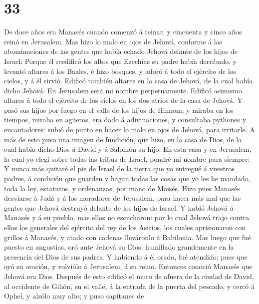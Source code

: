 \hypertarget{section-32}{%
\section{33}\label{section-32}}

 De doce años era Manasés cuando comenzó á reinar, y
cincuenta y cinco años reinó en Jerusalem.  Mas hizo lo
malo en ojos de Jehová, conforme á las abominaciones de las gentes que
había echado Jehová delante de los hijos de Israel: 
Porque él reedificó los altos que Ezechîas su padre había derribado, y
levantó altares á los Baales, é hizo bosques, y adoró á todo el ejército
de los cielos, y á él sirvió.  Edificó también altares en
la casa de Jehová, de la cual había dicho Jehová: En Jerusalem será mi
nombre perpetuamente.  Edificó asimismo altares á todo el
ejército de los cielos en los dos atrios de la casa de Jehová.
 Y pasó sus hijos por fuego en el valle de los hijos de
Hinnom; y miraba en los tiempos, miraba en agüeros, era dado á
adivinaciones, y consultaba pythones y encantadores: subió de punto en
hacer lo malo en ojos de Jehová, para irritarle.  A más de
esto puso una imagen de fundición, que hizo, en la casa de Dios, de la
cual había dicho Dios á David y á Salomón su hijo: En esta casa y en
Jerusalem, la cual yo elegí sobre todas las tribus de Israel, pondré mi
nombre para siempre:  Y nunca más quitaré el pie de Israel
de la tierra que yo entregué á vuestros padres, á condición que guarden
y hagan todas las cosas que yo les he mandado, toda la ley, estatutos, y
ordenanzas, por mano de Moisés.  Hizo pues Manasés
desviarse á Judá y á los moradores de Jerusalem, para hacer más mal que
las gentes que Jehová destruyó delante de los hijos de Israel.
 Y habló Jehová á Manasés y á su pueblo, mas ellos no
escucharon: por lo cual Jehová trajo contra ellos los generales del
ejército del rey de los Asirios, los cuales aprisionaron con grillos á
Manasés, y atado con cadenas lleváronlo á Babilonia.  Mas
luego que fué puesto en angustias, oró ante Jehová su Dios, humillado
grandemente en la presencia del Dios de sus padres.  Y
habiendo á él orado, fué atendido; pues que oyó su oración, y volviólo á
Jerusalem, á su reino. Entonces conoció Manasés que Jehová era Dios.
 Después de esto edificó el muro de afuera de la ciudad
de David, al occidente de Gihón, en el valle, á la entrada de la puerta
del pescado, y cercó á Ophel, y alzólo muy alto; y puso capitanes de
